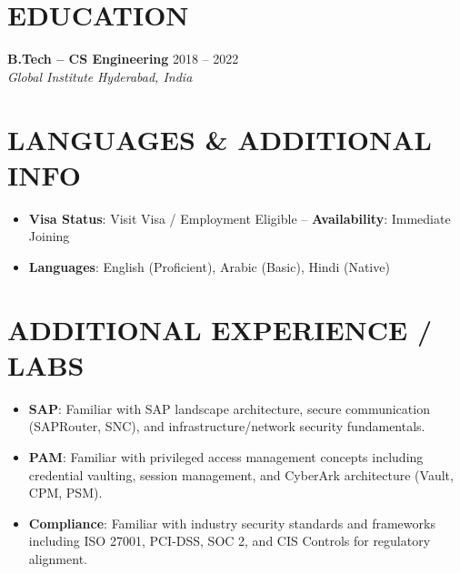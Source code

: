 \documentclass[10pt,a4paper]{article}
\newcommand{\jobheading}[4]{
  \vspace{0.2ex}\noindent
  \textbf{#1} \hfill #2 \\
  \textit{#3} \hfill \textit{#4} \vspace{0.2ex}
}
\begin{document}
\vspace{-1.5ex}
\section*{EDUCATION}
\jobheading{B.Tech -- CS Engineering}{2018 -- 2022}{Global Institute}{Hyderabad, India}

\section*{LANGUAGES \& ADDITIONAL INFO}
\begin{itemize}[leftmargin=*,itemsep=0pt,parsep=0pt]
    \item \textbf{Visa Status}: Visit Visa / Employment Eligible -- \textbf{Availability}: Immediate Joining
    \item \textbf{Languages}: English (Proficient), Arabic (Basic), Hindi (Native)
\end{itemize}

\section*{ADDITIONAL EXPERIENCE / LABS}
\begin{itemize}[leftmargin=*,itemsep=1pt,parsep=0pt]
    \item \textbf{SAP}: Familiar with SAP landscape architecture, secure communication (SAPRouter, SNC), and infrastructure/network security fundamentals.
    \item \textbf{PAM}: Familiar with privileged access management concepts including credential vaulting, session management, and CyberArk architecture (Vault, CPM, PSM).
    \item \textbf{Compliance}: Familiar with industry security standards and frameworks including ISO 27001, PCI-DSS, SOC 2, and CIS Controls for regulatory alignment.
\end{itemize}
\end{document}
